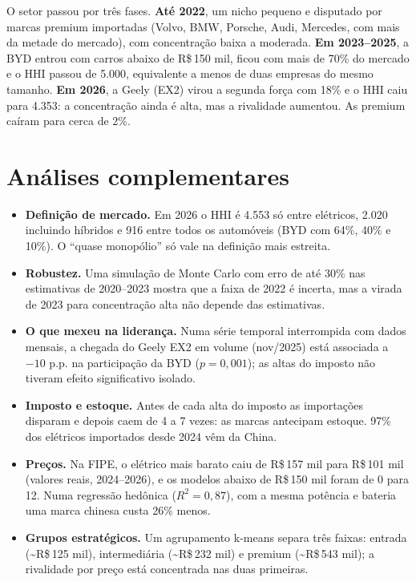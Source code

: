 \documentclass[10pt,a4paper]{article}
\begin{document}
\smallskip
O setor passou por três fases. \textbf{Até 2022}, um nicho pequeno e disputado por marcas premium importadas (Volvo, BMW, Porsche, Audi, Mercedes, com mais da metade do mercado), com concentração baixa a moderada. \textbf{Em 2023--2025}, a BYD entrou com carros abaixo de R\$\,150 mil, ficou com mais de 70\% do mercado e o HHI passou de 5.000, equivalente a menos de duas empresas do mesmo tamanho. \textbf{Em 2026}, a Geely (EX2) virou a segunda força com 18\% e o HHI caiu para 4.353: a concentração ainda é alta, mas a rivalidade aumentou. As premium caíram para cerca de 2\%.

\section{Análises complementares}
\begin{itemize}
  \item \textbf{Definição de mercado.} Em 2026 o HHI é 4.553 só entre elétricos, 2.020 incluindo híbridos e 916 entre todos os automóveis (BYD com 64\%, 40\% e 10\%). O ``quase monopólio'' só vale na definição mais estreita.
  \item \textbf{Robustez.} Uma simulação de Monte Carlo com erro de até 30\% nas estimativas de 2020--2023 mostra que a faixa de 2022 é incerta, mas a virada de 2023 para concentração alta não depende das estimativas.
  \item \textbf{O que mexeu na liderança.} Numa série temporal interrompida com dados mensais, a chegada do Geely EX2 em volume (nov/2025) está associada a $-10$ p.p. na participação da BYD ($p=0{,}001$); as altas do imposto não tiveram efeito significativo isolado.
  \item \textbf{Imposto e estoque.} Antes de cada alta do imposto as importações disparam e depois caem de 4 a 7 vezes: as marcas antecipam estoque. 97\% dos elétricos importados desde 2024 vêm da China.
  \item \textbf{Preços.} Na FIPE, o elétrico mais barato caiu de R\$\,157 mil para R\$\,101 mil (valores reais, 2024--2026), e os modelos abaixo de R\$\,150 mil foram de 0 para 12. Numa regressão hedônica ($R^2=0{,}87$), com a mesma potência e bateria uma marca chinesa custa 26\% menos.
  \item \textbf{Grupos estratégicos.} Um agrupamento k-means separa três faixas: entrada (\textasciitilde R\$\,125 mil), intermediária (\textasciitilde R\$\,232 mil) e premium (\textasciitilde R\$\,543 mil); a rivalidade por preço está concentrada nas duas primeiras.
\end{itemize}
\end{document}
